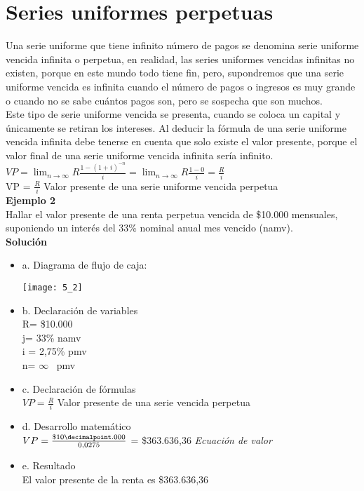 \section{Series uniformes perpetuas}

Una serie uniforme que tiene infinito número de pagos se denomina serie uniforme vencida infinita o perpetua, en realidad, las series uniformes vencidas infinitas no existen, porque en este mundo todo tiene fin, pero, supondremos que una serie uniforme vencida es infinita cuando el número de pagos o ingresos es muy grande o cuando no se sabe cuántos pagos son, pero se sospecha que son muchos.\\

Este tipo de serie uniforme vencida se presenta, cuando se coloca un capital y únicamente se retiran los intereses.  Al deducir la fórmula de una serie uniforme vencida infinita debe tenerse en cuenta que solo existe el valor presente, porque el valor final de una serie uniforme vencida infinita sería infinito.\\

$ VP = \lim_{n\to \infty}R\frac{1-(1+i)^{-n}}{i} = \lim_{n\to \infty} R\frac{1-0}{i} = \frac{R}{i}$\\  	

VP = $\frac{R}{i}$ Valor presente de una serie uniforme vencida perpetua \\

\textbf{Ejemplo 2}\\

Hallar el valor presente de una renta perpetua vencida de \$10.000 mensuales, suponiendo un interés del 33\% nominal anual mes vencido (namv).\\

\textbf{Solución}\\
\begin{itemize}
    \item a. Diagrama de flujo de caja:\\
    \begin{center}
		\texttt{[image: 5\_2]}
	\end{center} 
	\item b. Declaración de variables\\
	R= \$10.000\\
	j= 33\% namv\\
	i = 2,75\% pmv\\
	n= $\infty$ \ pmv\\
	\item c. Declaración de fórmulas\\
	$VP = \frac{R}{i}$ Valor presente de una serie vencida perpetua\\
	\item d. Desarrollo matemático\\
	$VP = \frac{\$10\decimalpoint.000}{0,0275}$ = \$363.636,36 \hspace{35 pt} \textit{Ecuación de valor}\\
	\item e. Resultado\\
	El valor presente de la renta es \$363.636,36\\
\end{itemize}

